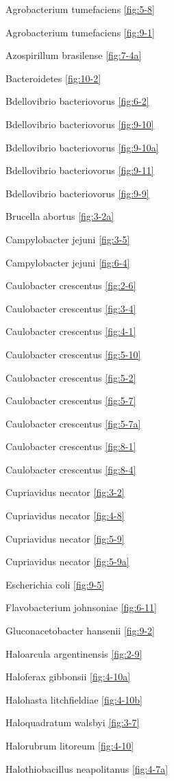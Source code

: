 \documentclass[]{tufte-book}
\begin{document}
Agrobacterium tumefaciens \ref{fig:5-8}

Agrobacterium tumefaciens \ref{fig:9-1}

Azospirillum brasilense \ref{fig:7-4a}

Bacteroidetes \ref{fig:10-2}

Bdellovibrio bacteriovorus \ref{fig:6-2}

Bdellovibrio bacteriovorus \ref{fig:9-10}

Bdellovibrio bacteriovorus \ref{fig:9-10a}

Bdellovibrio bacteriovorus \ref{fig:9-11}

Bdellovibrio bacteriovorus \ref{fig:9-9}

Brucella abortus \ref{fig:3-2a}

Campylobacter jejuni \ref{fig:3-5}

Campylobacter jejuni \ref{fig:6-4}

Caulobacter crescentus \ref{fig:2-6}

Caulobacter crescentus \ref{fig:3-4}

Caulobacter crescentus \ref{fig:4-1}

Caulobacter crescentus \ref{fig:5-10}

Caulobacter crescentus \ref{fig:5-2}

Caulobacter crescentus \ref{fig:5-7}

Caulobacter crescentus \ref{fig:5-7a}

Caulobacter crescentus \ref{fig:8-1}

Caulobacter crescentus \ref{fig:8-4}

Cupriavidus necator \ref{fig:3-2}

Cupriavidus necator \ref{fig:4-8}

Cupriavidus necator \ref{fig:5-9}

Cupriavidus necator \ref{fig:5-9a}

Escherichia coli \ref{fig:9-5}

Flavobacterium johnsoniae \ref{fig:6-11}

Gluconacetobacter hansenii \ref{fig:9-2}

Haloarcula argentinensis \ref{fig:2-9}

Haloferax gibbonsii \ref{fig:4-10a}

Halohasta litchfieldiae \ref{fig:4-10b}

Haloquadratum walsbyi \ref{fig:3-7}

Halorubrum litoreum \ref{fig:4-10}

Halothiobacillus neapolitanus \ref{fig:4-7a}
\end{document}
